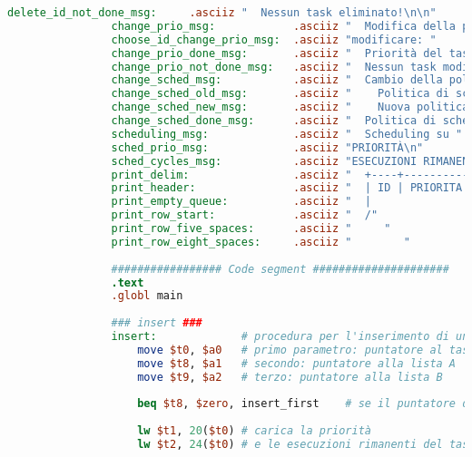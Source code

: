 \begin{center}
\begin{lstlisting}[language=mips, gobble=14, stepnumber=1]
                delete_id_not_done_msg:     .asciiz "  Nessun task eliminato!\n\n"
                change_prio_msg:            .asciiz "  Modifica della priorità di un task specifico.\n"
                choose_id_change_prio_msg:  .asciiz "modificare: "
                change_prio_done_msg:       .asciiz "  Priorità del task correttamente modificata!\n\n"
                change_prio_not_done_msg:   .asciiz "  Nessun task modificato!\n\n"
                change_sched_msg:           .asciiz "  Cambio della politica di scheduling.\n"
                change_sched_old_msg:       .asciiz "    Politica di scheduling attuale: su "
                change_sched_new_msg:       .asciiz "    Nuova politica di scheduling: su "
                change_sched_done_msg:      .asciiz "  Politica di scheduling correttamente cambiata!\n\n"
                scheduling_msg:             .asciiz "  Scheduling su "
                sched_prio_msg:             .asciiz "PRIORITÀ\n"
                sched_cycles_msg:           .asciiz "ESECUZIONI RIMANENTI\n"
                print_delim:                .asciiz "  +----+-----------+-----------+-------------------+\n"
                print_header:               .asciiz "  | ID | PRIORITA' | NOME TASK | ESECUZ. RIMANENTI |\n"
                print_empty_queue:          .asciiz "  |                  Coda vuota!                   |\n"
                print_row_start:            .asciiz "  /"
                print_row_five_spaces:      .asciiz "     "
                print_row_eight_spaces:     .asciiz "        "
                
                ################# Code segment #####################
                .text
                .globl main
                
                ### insert ###
                insert:             # procedura per l'inserimento di un task nelle liste
                    move $t0, $a0   # primo parametro: puntatore al task da inserire
                    move $t8, $a1   # secondo: puntatore alla lista A
                    move $t9, $a2   # terzo: puntatore alla lista B
                    
                    beq $t8, $zero, insert_first    # se il puntatore d'inizio è nullo (coda vuota), salta all'inserimento del primo task nella coda
                    
                    lw $t1, 20($t0) # carica la priorità
                    lw $t2, 24($t0) # e le esecuzioni rimanenti del task da inserire
                    

\end{lstlisting}
\end{center}
